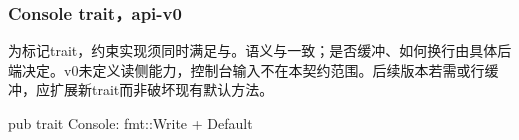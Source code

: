 
\subsubsection{Console trait，api-v0}

为标记trait，约束实现须同时满足与。语义与一致；是否缓冲、如何换行由具体后端决定。v0未定义读侧能力，控制台输入不在本契约范围。后续版本若需或行缓冲，应扩展新trait而非破坏现有默认方法。

\begin{rustcode}
pub trait Console: fmt::Write + Default {}
\end{rustcode}
